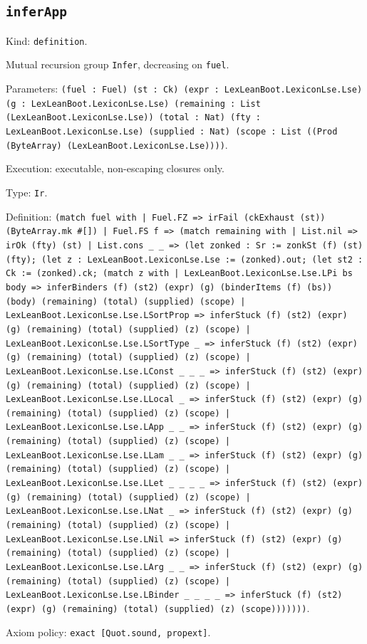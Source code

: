 \documentclass[11pt]{article}
\begin{document}
\subsection*{\texttt{inferApp}}
\noindent Kind: \texttt{definition}.\par
\noindent Mutual recursion group \texttt{Infer}, decreasing on \texttt{fuel}.\par
\noindent Parameters: \texttt{(fuel : Fuel) (st : Ck) (expr : LexLeanBoot.LexiconLse.Lse) (g : LexLeanBoot.LexiconLse.Lse) (remaining : List (LexLeanBoot.LexiconLse.Lse)) (total : Nat) (fty : LexLeanBoot.LexiconLse.Lse) (supplied : Nat) (scope : List ((Prod (ByteArray) (LexLeanBoot.LexiconLse.Lse))))}.\par
\noindent Execution: executable, non-escaping closures only.\par
\noindent Type: \texttt{Ir}.\par
\noindent Definition: \texttt{(match fuel with | Fuel.FZ => irFail (ckExhaust (st)) (ByteArray.mk \#[]) | Fuel.FS f => (match remaining with | List.nil => irOk (fty) (st) | List.cons \_ \_ => (let zonked : Sr := zonkSt (f) (st) (fty); (let z : LexLeanBoot.LexiconLse.Lse := (zonked).out; (let st2 : Ck := (zonked).ck; (match z with | LexLeanBoot.LexiconLse.Lse.LPi bs body => inferBinders (f) (st2) (expr) (g) (binderItems (f) (bs)) (body) (remaining) (total) (supplied) (scope) | LexLeanBoot.LexiconLse.Lse.LSortProp => inferStuck (f) (st2) (expr) (g) (remaining) (total) (supplied) (z) (scope) | LexLeanBoot.LexiconLse.Lse.LSortType \_ => inferStuck (f) (st2) (expr) (g) (remaining) (total) (supplied) (z) (scope) | LexLeanBoot.LexiconLse.Lse.LConst \_ \_ \_ => inferStuck (f) (st2) (expr) (g) (remaining) (total) (supplied) (z) (scope) | LexLeanBoot.LexiconLse.Lse.LLocal \_ => inferStuck (f) (st2) (expr) (g) (remaining) (total) (supplied) (z) (scope) | LexLeanBoot.LexiconLse.Lse.LApp \_ \_ => inferStuck (f) (st2) (expr) (g) (remaining) (total) (supplied) (z) (scope) | LexLeanBoot.LexiconLse.Lse.LLam \_ \_ => inferStuck (f) (st2) (expr) (g) (remaining) (total) (supplied) (z) (scope) | LexLeanBoot.LexiconLse.Lse.LLet \_ \_ \_ \_ => inferStuck (f) (st2) (expr) (g) (remaining) (total) (supplied) (z) (scope) | LexLeanBoot.LexiconLse.Lse.LNat \_ => inferStuck (f) (st2) (expr) (g) (remaining) (total) (supplied) (z) (scope) | LexLeanBoot.LexiconLse.Lse.LNil => inferStuck (f) (st2) (expr) (g) (remaining) (total) (supplied) (z) (scope) | LexLeanBoot.LexiconLse.Lse.LArg \_ \_ => inferStuck (f) (st2) (expr) (g) (remaining) (total) (supplied) (z) (scope) | LexLeanBoot.LexiconLse.Lse.LBinder \_ \_ \_ \_ => inferStuck (f) (st2) (expr) (g) (remaining) (total) (supplied) (z) (scope)))))))}.\par
\noindent Axiom policy: \texttt{exact [Quot.sound, propext]}.\par
\end{document}
